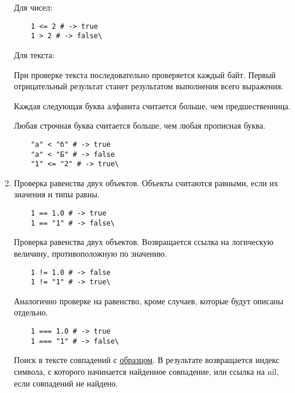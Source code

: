\begin{enumerate}
\begin{operator}
    Для чисел:
    \begin{verbatim}
    1 <= 2 # -> true
    1 > 2 # -> false\
    \end{verbatim}

    Для текста:

    При проверке текста последовательно проверяется каждый байт. Первый отрицательный результат станет результатом выполнения всего выражения.

    Каждая следующая буква алфавита считается больше, чем предшественница.

    Любая строчная буква считается больше, чем любая прописная буква.
    \begin{verbatim}
    "а" < "б" # -> true
    "а" < "Б" # -> false
    "1" <= "2" # -> true\
    \end{verbatim}
  \end{operator}

  \item %
  \begin{operator}
    Проверка равенства двух объектов. Объекты считаются равными, если их значения и типы равны.
    \begin{verbatim}
    1 == 1.0 # -> true
    1 == "1" # -> false\
    \end{verbatim}
  \end{operator}

  \begin{operator}
    Проверка равенства двух объектов. Возвращается ссылка на логическую величину, противоположную по значению.
    \begin{verbatim}
    1 != 1.0 # -> false
    1 != "1" # -> true\
    \end{verbatim}
  \end{operator}

  \begin{operator}
    Аналогично проверке на равенство, кроме случаев, которые будут описаны отдельно.
    \begin{verbatim}
    1 === 1.0 # -> true
    1 === "1" # -> false\
    \end{verbatim}
  \end{operator}

  \begin{operator}
    Поиск в тексте совпадений с \hyperlink{appregexp}{\underline{образцом}}. В результате возвращается индекс символа, с которого начинается найденное совпадение, или ссылка на nil, если совпадений не найдено.
  \end{operator}


\end{enumerate}
